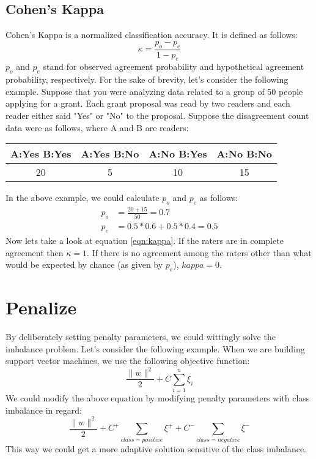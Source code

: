 \documentclass{article}
\begin{document}
\subsection{Cohen's Kappa}
Cohen's Kappa is a normalized classification accuracy. It is defined as follows:
\begin{equation}
\kappa = \frac{p_o - p_e}{1 - p_e}
\label{eqn:kappa}
\end{equation}
$p_o$ and $p_e$ stand for observed agreement probability and hypothetical agreement probability, respectively. For the sake of brevity, let's consider the following example. Suppose that you were analyzing data related to a group of 50 people applying for a grant. Each grant proposal was read by two readers and each reader either said "Yes" or "No" to the proposal. Suppose the disagreement count data were as follows, where A and B are readers:
\begin{table}[h!]
\begin{center}
\begin{tabular}{|c|c|c|c|}
\hline 
A:Yes B:Yes & A:Yes B:No & A:No B:Yes & A:No B:No \\ 
\hline 
20 & 5 & 10 & 15 \\ 
\hline 
\end{tabular}
\end{center} 
\end{table}
In the above example, we could calculate $p_o$ and $p_e$ as follows:
\begin{align}
p_o &= \frac{20 + 15}{50} = 0.7\\
p_e &= 0.5*0.6 + 0.5*0.4 = 0.5
\end{align}
Now lets take a look at equation \ref{eqn:kappa}. If the raters are in complete agreement then $\kappa = 1$. If there is no agreement among the raters other than what would be expected by chance (as given by $p_e$), $kappa = 0$.
\section{Penalize}
By deliberately setting penalty parameters, we could wittingly solve the imbalance problem. Let's consider the following example. When we are building support vector machines, we use the following objective function:
\begin{equation}
\frac{\parallel w \parallel^2}{2} + C\sum_{i=1}^{n}\xi_i
\end{equation}
We could modify the above equation by modifying penalty parameters with class imbalance in regard:
\begin{equation}
\frac{\parallel w \parallel^2}{2} + C^{+}\sum_{class = positive}\xi^{+} + C^{-}\sum_{class = negative}\xi^{-}
\end{equation}
This way we could get a more adaptive solution sensitive of the class imbalance.
\end{document}
